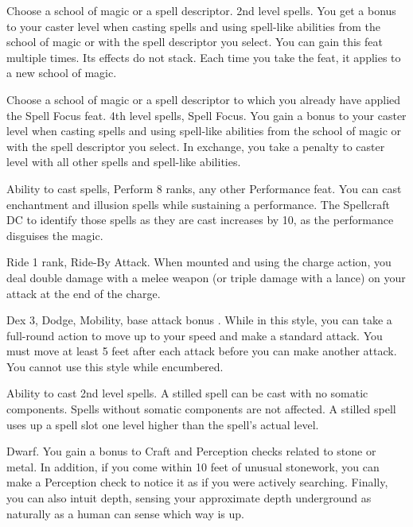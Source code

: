 Choose a school of magic or a spell descriptor.
 2nd level spells.
 You get a  bonus to your caster level when casting spells and using spell-like abilities from the school of magic or with the spell descriptor you select.
 You can gain this feat multiple times. Its effects do not stack. Each time you take the feat, it applies to a new school of magic.

Choose a school of magic or a spell descriptor to which you already have applied the Spell Focus feat.
\featpre 4th level spells, Spell Focus.
\featben You gain a  bonus to your caster level when casting spells and using spell-like abilities from the school of magic or with the spell descriptor you select. In exchange, you take a  penalty to caster level with all other spells and spell-like abilities.

\featpre Ability to cast spells, Perform 8 ranks, any other Performance feat.
\featben You can cast enchantment and illusion spells while sustaining a performance. The Spellcraft DC to identify those spells as they are cast increases by 10, as the performance disguises the magic.

 Ride 1 rank, Ride-By Attack.
 When mounted and using the charge action, you deal double damage with a melee weapon (or triple damage with a lance) on your attack at the end of the charge.%

 Dex 3, Dodge, Mobility, base attack bonus .
 While in this style, you can take a full-round action to move up to your speed and make a standard attack. You must move at least 5 feet after each attack before you can make another attack. You cannot use this style while encumbered.

 Ability to cast 2nd level spells.
 A stilled spell can be cast with no somatic components. Spells without somatic components are not affected. A stilled spell uses up a spell slot one level higher than the spell's actual level.

 Dwarf.
 You gain a  bonus to Craft and Perception checks related to stone or metal. In addition, if you come within 10 feet of unusual stonework, you can make a Perception check to notice it as if you were actively searching. Finally, you can also intuit depth, sensing your approximate depth underground as naturally as a human can sense which way is up.

